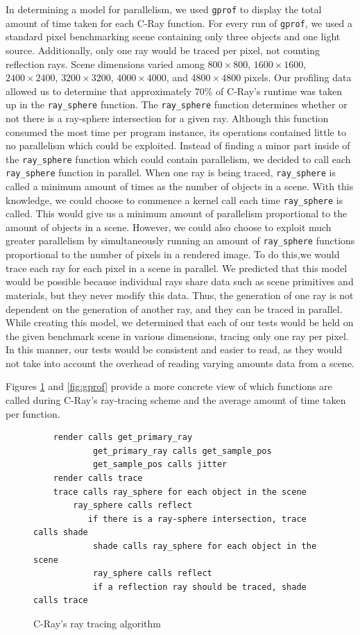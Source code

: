 \documentclass[12pt]{article}
\begin{document}
In determining a model for parallelism, we used \texttt{gprof} to display the total amount of time taken for each C-Ray function. For every run of \texttt{gprof}, we used a standard pixel benchmarking scene containing only three objects and one light source. Additionally, only one ray would be traced per pixel, not counting reflection rays. Scene dimensions varied among $800\times 800$, $1600 \times 1600$, $2400 \times 2400$, $3200 \times 3200$, $4000 \times 4000$, and $4800 \times 4800$ pixels. Our profiling data allowed us to determine that approximately 70\% of C-Ray's runtime was taken up in the \texttt{ray\_sphere} function. The \texttt{ray\_sphere} function determines whether or not there is a ray-sphere intersection for a given ray. Although this function consumed the most time per program instance, its operations contained little to no parallelism which could be exploited. Instead of finding a minor part inside of the \texttt{ray\_sphere} function which could contain parallelism, we decided to call each \texttt{ray\_sphere} function in parallel. When one ray is being traced, \texttt{ray\_sphere} is called a minimum amount of times as the number of objects in a scene. With this knowledge, we could choose to commence a kernel call each time \texttt{ray\_sphere} is called. This would give us a minimum amount of parallelism proportional to the amount of objects in a scene. However, we could also choose to exploit much greater parallelism by simultaneously running an amount of \texttt{ray\_sphere} functions proportional to the number of pixels in a rendered image. To do this,we would trace each ray for each pixel in a scene in parallel. We predicted that this model would be possible because individual rays share data such as scene primitives and materials, but they never modify this data. Thus, the generation of one ray is not dependent on the generation of another ray, and they can be traced in parallel. While creating this model, we determined that each of our tests would be held on the given benchmark scene in various dimensions, tracing only one ray per pixel. In this manner, our tests would be consistent and easier to read, as they would not take into account the overhead of reading varying amounts data from a scene.

Figures \ref{code:c-ray} and \ref{fig:gprof} provide a more concrete view of which functions are called during C-Ray's ray-tracing scheme and the average amount of time taken per function.

\begin{figure}
    \caption{C-Ray's ray tracing algorithm} \label{code:c-ray}
    \begin{lstlisting}
    render calls get_primary_ray
            get_primary_ray calls get_sample_pos
            get_sample_pos calls jitter
    render calls trace
    trace calls ray_sphere for each object in the scene
        ray_sphere calls reflect
           if there is a ray-sphere intersection, trace calls shade
            shade calls ray_sphere for each object in the scene
            ray_sphere calls reflect
            if a reflection ray should be traced, shade calls trace
    \end{lstlisting}
\end{figure}
\end{document}
